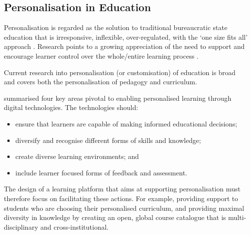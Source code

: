 \subsection{Personalisation in Education}


Personalisation is regarded as the solution to traditional bureaucratic state education that is irresponsive,
inflexible, over-regulated, with the ‘one size fits all’ approach \citep{bragg2014review}. 
Research points to a growing appreciation of the need to support and
encourage learner control over the whole/entire learning process \citep{dron2007designing}.

Current research into personalisation (or customisation) of education is broad and covers both the personalisation
of pedagogy and curriculum. 

\citet{green2005futurelab} summarised four key areas pivotal to enabling personalised learning through digital
technologies. The technologies should:

\begin{itemize}
	\setlength\itemsep{0em}
	\item ensure that learners are capable of making informed educational decisions;
	\item diversify and recognise different forms of skills and knowledge;
	\item create diverse learning environments; and
	\item include learner focused forms of feedback and assessment.
\end{itemize}

The design of a learning platform that aims at supporting personalisation must therefore focus on facilitating these
actions. For example, providing support to students who are choosing their personalised curriculum, and 
providing maximal diversity in knowledge by creating an open, global course catalogue that is 
multi-disciplinary and cross-institutional.




